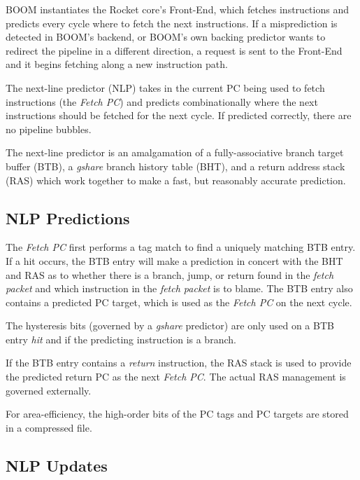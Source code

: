 BOOM instantiates the Rocket core's Front-End, which fetches instructions and predicts every cycle where to fetch the next instructions. If a misprediction is detected in BOOM's backend, or BOOM's own backing predictor wants to redirect the pipeline in a different direction, a request is sent to the Front-End and it begins fetching along a new instruction path. 

The next-line predictor (NLP) takes in the current PC being used to fetch instructions (the {\em Fetch PC}) and predicts combinationally where the next instructions should be fetched for the next cycle. If predicted correctly, there are no pipeline bubbles. 

The next-line predictor is an amalgamation of a fully-associative branch target buffer (BTB), a {\em gshare} branch history table (BHT), and a return address stack (RAS) which work together to make a fast, but reasonably accurate prediction.

\subsection{NLP Predictions}

The {\em Fetch PC} first performs a tag match to find a uniquely matching BTB entry.  
If a hit occurs, the BTB entry will make a prediction in concert with the BHT and RAS as to whether there is a branch, jump, or return found in the {\em fetch packet} and which instruction in the {\em fetch packet} is to blame.  
The BTB entry also contains a predicted PC target, which is used as the {\em Fetch PC} on the next cycle.





The hysteresis bits (governed by a {\em gshare} predictor) are only used on a BTB entry {\em hit} and if the predicting instruction is a branch. 

If the BTB entry contains a {\em return} instruction, the RAS stack is used to provide the predicted return PC as the next {\em Fetch PC}. The actual RAS management is governed externally. 

For area-efficiency, the high-order bits of the PC tags and PC targets are stored in a compressed file.


\subsection{NLP Updates}

